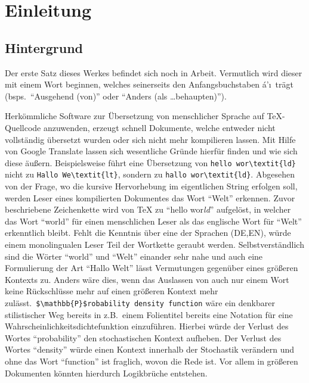\section{Einleitung}
\subsection{Hintergrund}\label{einleitung:hintergrund}
Der erste Satz dieses Werkes befindet sich noch in Arbeit. Vermutlich wird dieser mit einem Wort beginnen, welches seinerseits den Anfangsbuchstaben \'a'\i\ trägt (bsps.\ \enquote{Ausgehend (von)} oder \enquote{Anders (als \ldots behaupten)}).%

Herkömmliche Software zur Übersetzung von menschlicher Sprache auf \TeX{}-Quellcode anzuwenden, erzeugt schnell Dokumente, welche entweder nicht vollständig übersetzt wurden oder sich nicht mehr kompilieren lassen. Mit Hilfe von Google Translate lassen sich wesentliche Gründe hierfür finden und wie sich diese äußern. Beispielsweise führt eine Übersetzung von \verb|hello wor\textit{ld}| nicht zu \verb|Hallo We\textit{lt}|, sondern zu \verb|hallo wor\textit{ld}|. Abgesehen von der Frage, wo die kursive Hervorhebung im eigentlichen String erfolgen soll, werden Leser eines kompilierten Dokumentes das Wort \enquote{Welt} erkennen. Zuvor beschriebene Zeichenkette wird von \TeX{} zu \enquote{hello wor\textit{ld}} aufgelöst, in welcher das Wort \enquote{world} für einen menschlichen Leser als das englische Wort für \enquote{Welt} erkenntlich bleibt. Fehlt die Kenntnis über eine der Sprachen (DE,EN), würde einem monolingualen Leser Teil der Wortkette geraubt werden. Selbstverständlich sind die Wörter \enquote{world} und \enquote{Welt} einander sehr nahe und auch eine Formulierung der Art \enquote{Hallo Welt} lässt Vermutungen gegenüber eines größeren Kontexts zu.%
Anders wäre dies, wenn das Auslassen von auch nur einem Wort keine Rückschlüsse mehr auf einen größeren Kontext mehr zulässt.\ \verb|$\mathbb{P}$robability density function| wäre ein denkbarer stilistischer Weg bereits in z.B.\ einem Folientitel bereits eine Notation für eine Wahrscheinlichkeitsdichtefunktion einzuführen. Hierbei würde der Verlust des Wortes \enquote{probability} den stochastischen Kontext aufheben. Der Verlust des Wortes \enquote{density} würde einen Kontext innerhalb der Stochastik verändern und ohne das Wort \enquote{function} ist fraglich, wovon die Rede ist. Vor allem in größeren Dokumenten könnten hierdurch Logikbrüche entstehen.%
\\\noindent


